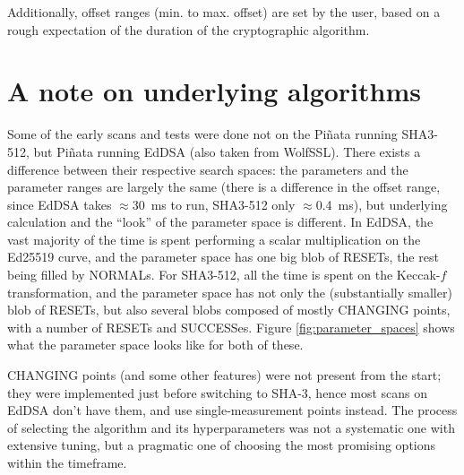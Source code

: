 \documentclass[times, utf8, diplomski]{fer}
\begin{document}
Additionally, offset ranges (min. to max. offset) are set by the user,
based on a rough expectation of the duration of the cryptographic algorithm.



\section{A note on underlying algorithms}\label{sec:note_on_algorithms}
Some of the early scans and tests were done not on the Piñata running SHA3-512,
but Piñata running EdDSA (also taken from WolfSSL). There exists a difference
between their respective search spaces: the parameters and the parameter ranges
are largely the same (there is a difference in the offset range, since EdDSA
takes $\approx$\SI{30}{\milli\second} to run, SHA3-512 only $\approx$\SI{0.4}{\milli\second}),
but underlying calculation and the ``look'' of the parameter space is different.
In EdDSA, the vast majority of the time is spent performing a scalar
multiplication on the Ed25519 curve, and the parameter space has one big
blob of RESETs, the rest being filled by NORMALs. For SHA3-512, all the
time is spent on the Keccak-$f$ transformation, and the parameter space
has not only the (substantially smaller) blob of RESETs, but also several
blobs composed of mostly CHANGING points, with a number of RESETs and SUCCESSes.
Figure \ref{fig:parameter_spaces} shows what the parameter space looks like
for both of these.

CHANGING points (and some other features) were not present from the start;
they were implemented just before switching to SHA-3, hence most scans on EdDSA
don't have them, and use single-measurement points instead. The process of
selecting the algorithm and its hyperparameters was not a systematic one
with extensive tuning, but a pragmatic one of choosing the most promising
options within the timeframe.
\end{document}
